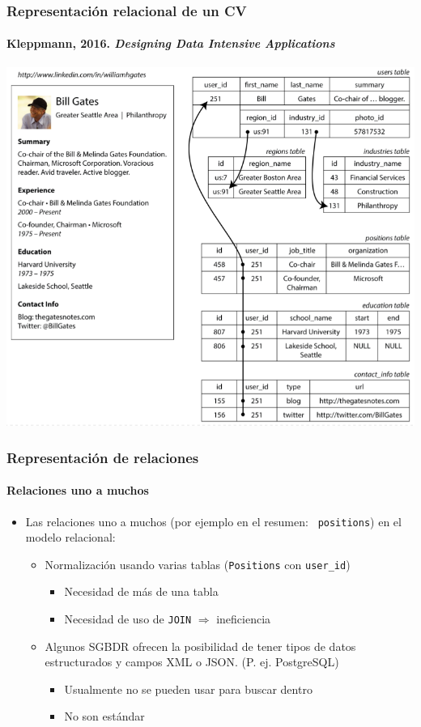 \documentclass[14pt]{beamer}
\begin{document}
\begin{frame}
  \frametitle{Representación relacional de un CV}
\framesubtitle{Kleppmann, 2016. \emph{Designing Data Intensive Applications}}
\vspace*{-.8ex}
  \centering\includegraphics[height=.86\textheight]{img/gates}
\end{frame}

\begin{frame}
  \frametitle{Representación de relaciones}
\framesubtitle{Relaciones uno a muchos}
\begin{itemize}
\item Las relaciones uno a muchos (por ejemplo en el resumen: {\tt
    positions}) en el modelo relacional:
\begin{itemize}
\item Normalización usando varias tablas ({\tt Positions} con
  {\tt user\_id})
  \begin{itemize}
  \item Necesidad de más de una tabla
  \item Necesidad de uso de {\tt JOIN} $\Rightarrow$ ineficiencia
  \end{itemize}
\item Algunos SGBDR ofrecen la posibilidad de tener tipos de datos
  estructurados y campos XML o JSON. (P. ej. PostgreSQL)
  \begin{itemize}
  \item Usualmente no se pueden usar para buscar dentro
  \item No son estándar
  \end{itemize}
\end{itemize}
\end{itemize}
\end{frame}
\end{document}
